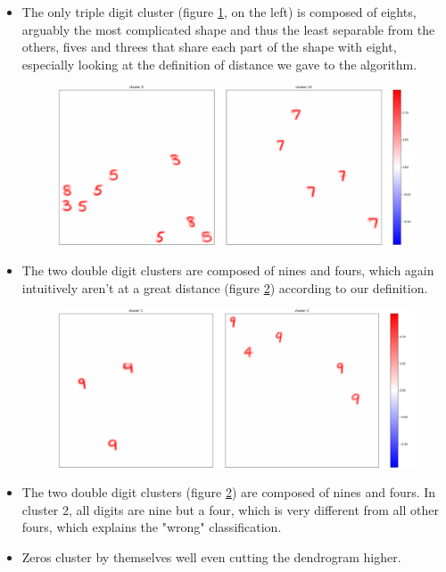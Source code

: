 \documentclass[a4paper]{report}
\begin{document}
\begin{itemize}
    \item The only triple digit cluster (figure \ref{910}, on the left) is composed of eights, arguably the most complicated shape and thus the least separable from the others, fives and threes that share each part of the shape with eight, especially looking at the definition of distance we gave to the algorithm.

\begin{figure} [H]
    \centering
    \includegraphics [width=\textwidth ] {c/h/9.png}
    \caption{}
    \label{910}
\end{figure}

    \item The two double digit clusters are composed of nines and fours, which again intuitively aren't at a great distance (figure \ref{12}) according to our definition.

\begin{figure} [H]
    \centering
    \includegraphics [width=\textwidth ] {c/h/1.png}
    \caption{}
    \label{12}
\end{figure}

    \item The two double digit clusters (figure \ref{12}) are composed of nines and fours. In cluster 2, all digits are nine but a four, which is very different from all other fours, which explains the "wrong" classification.
    \item Zeros cluster by themselves well even cutting the dendrogram higher.


\end{itemize}
\end{document}
